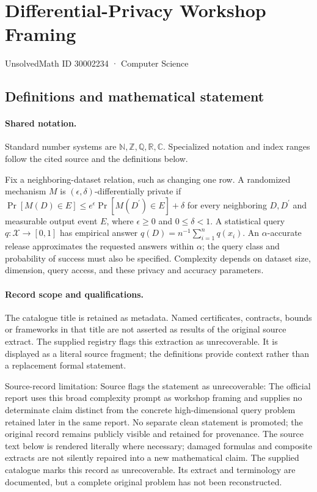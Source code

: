 \documentclass[11pt]{article}
\begin{document}
\setcounter{section}{30002233}
\section{Differential-Privacy Workshop Framing}\label{30002234}
{\small\sffamily UnsolvedMath ID 30002234 · Computer Science}
\subsection{Definitions and mathematical statement}

\paragraph{Shared notation.}Standard number systems are $\mathbb N,\mathbb Z,\mathbb Q,\mathbb R,\mathbb C$. Specialized notation and index ranges follow the cited source and the definitions below.


Fix a neighboring-dataset relation, such as changing one row. A randomized mechanism $M$ is $(\epsilon,\delta)$-differentially private if $\Pr[M(D)\in E]\le e^\epsilon\Pr[M(D^{\prime})\in E]+\delta$ for every neighboring $D,D^{\prime}$ and measurable output event $E$, where $\epsilon\ge0$ and $0\le\delta<1$. A statistical query $q:\mathcal X\to[0,1]$ has empirical answer $q(D)=n^{-1}\sum_{i=1}^n q(x_i)$. An $\alpha$-accurate release approximates the requested answers within $\alpha$; the query class and probability of success must also be specified. Complexity depends on dataset size, dimension, query access, and these privacy and accuracy parameters.
\paragraph{Record scope and qualifications.}
The catalogue title is retained as metadata. Named certificates, contracts, bounds or frameworks in that title are not asserted as results of the original source extract.
The supplied registry flags this extraction as unrecoverable. It is displayed as a literal source fragment; the definitions provide context rather than a replacement formal statement.

Source-record limitation: Source flags the statement as unrecoverable: The official report uses this broad complexity prompt as workshop framing and supplies no determinate claim distinct from the concrete high-dimensional query problem retained later in the same report. No separate clean statement is promoted; the original record remains publicly visible and retained for provenance.
The source text below is rendered literally where necessary; damaged formulas and composite extracts are not silently repaired into a new mathematical claim.
The supplied catalogue marks this record as unrecoverable. Its extract and terminology are documented, but a complete original problem has not been reconstructed.
\end{document}
